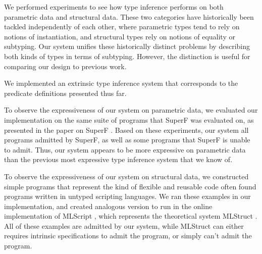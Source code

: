 \documentclass[acmsmall]{acmart}
\theoremstyle{definition}
\begin{document}
\noindent
We performed experiments to see how type inference performs on both parametric data and structural data. 
These two categories have historically been tackled independently of each other, where parametric types
tend to rely on notions of instantiation, and structural types rely on notions of equality or subtyping.
Our system unifies these historically distinct problems by describing both kinds of types in terms of subtyping.
However, the distinction is useful for comparing our design to previous work. 

We implemented an extrinsic type inference system that corresponds to the predicate definitions
presented thus far. 

To observe the expressiveness of our system on parametric data, 
we evaluated our implementation on the same suite of programs 
that SuperF was evaluated on, as presented in the paper on SuperF \cite{}.
Based on these experiments, our system all programs admitted by SuperF, as well as some programs 
that SuperF is unable to admit.
Thus, our system appears to be more expressive on parametric data than the previous most expressive
type inference system that we know of.

To observe the expressiveness of our system on structural data, 
we constructed simple programs that represent the kind of flexible and reusable code
often found programs written in untyped scripting languages. 
We ran these examples in our implementation, and created analogous version to run
in the online implementation of MLScript \cite{},
which represents the theoretical system MLStruct \cite{}. 
All of these examples are admitted by our system, while MLStruct
can either requires intrinsic specifications to admit the program, 
or simply can't admit the program.
\end{document}
